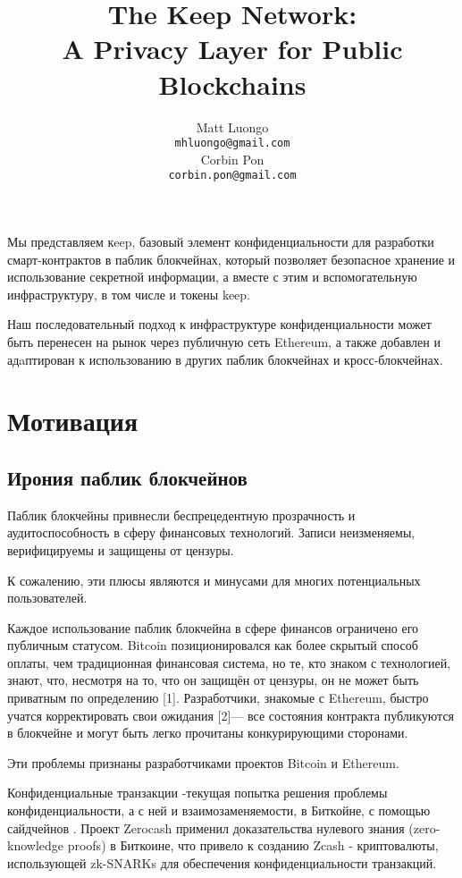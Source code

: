 \documentclass[11pt]{article}
\title{The Keep Network:\protect\\A Privacy Layer for Public Blockchains}
\author{Matt Luongo \\
  {\tt mhluongo@gmail.com} \\\And
  Corbin Pon \\
  {\tt corbin.pon@gmail.com} \\}
\date{}
\begin{document}
\thispagestyle{fancy}

\maketitle

\begin{Резюме}

  Мы представляем кeep, базовый элемент конфиденциальности 
  для разработки смарт-контрактов в паблик блокчейнах, который 
  позволяет безопасное хранение и использование секретной 
  информации, а вместе с этим и вспомогательную  инфраструктуру, 
  в том числе и токены keep.

  Наш последовательный подход к инфраструктуре конфиденциальности 
  может быть перенесен на рынок через публичную сеть Ethereum, 
  а также добавлен и адaптирован к использованию в других 
  паблик блокчейнах и кросс-блокчейнах.

\end{Резюме}

\section{Мотивация}

\subsection{Ирония паблик блокчейнов}

Паблик блокчейны привнесли беспрецедентную прозрачность и 
аудитоспособность в сферу финансовых технологий. 
Записи неизменяемы, верифицируемы и защищены от цензуры.

К сожалению, эти плюсы являются и минусами для многих потенциальных 
пользователей. 

Каждое использование паблик блокчейна в сфере финансов ограничено 
его публичным статусом. Bitcoin позиционировался как более скрытый 
способ оплаты, чем традиционная финансовая система, но те, кто 
знаком с технологией, знают, что, несмотря на то, что он защищён 
от цензуры, он не может быть приватным по определению [1]. 
Разработчики, знакомые с Ethereum, быстро учатся корректировать 
свои ожидания [2]— все состояния контракта публикуются в блокчейне 
и могут быть легко прочитаны конкурирующими сторонами.

Эти проблемы признаны разработчиками проектов Bitcoin и Ethereum.

Конфиденциальные транзакции \cite{confidentialTransactions}-текущая 
попытка решения проблемы конфиденциальности, а с ней и 
взаимозаменяемости, в Биткойне, с помощью сайдчейнов \cite{confidentialTransactionsElements}. 
Проект Zerocash \cite{zerocash} применил доказательства нулевого 
знания (zero-knowledge proofs) в Биткоине, что привело к созданию 
Zcash \cite{zcash}- криптовалюты, использующей zk-SNARKs для 
обеспечения конфиденциальности транзакций.
\end{document}

